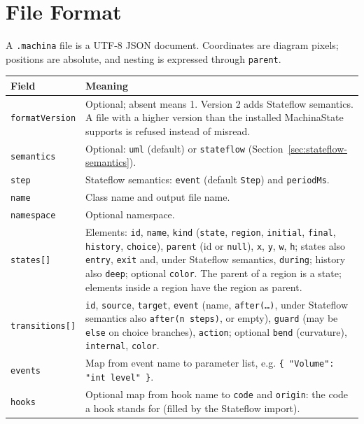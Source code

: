 \documentclass[11pt,a4paper,openany]{report}
\newcommand{\code}[1]{\texttt{#1}}
\begin{document}
\chapter{File Format}
\label{ch:format}

A \code{.machina} file is a UTF-8 JSON document. Coordinates are diagram pixels; positions are
absolute, and nesting is expressed through \code{parent}.

\begin{longtable}{@{}p{3.8cm}p{10.6cm}@{}}
\toprule
\textbf{Field} & \textbf{Meaning} \\
\midrule
\endhead
\code{formatVersion}         & Optional; absent means 1. Version 2 adds Stateflow semantics. A file with a higher version than the installed MachinaState supports is refused instead of misread. \\
\code{semantics}             & Optional: \code{uml} (default) or \code{stateflow} (Section~\ref{sec:stateflow-semantics}). \\
\code{step}                  & Stateflow semantics: \code{event} (default \code{Step}) and \code{periodMs}. \\
\code{name}                  & Class name and output file name. \\
\code{namespace}             & Optional namespace. \\
\code{states[]}              & Elements: \code{id}, \code{name}, \code{kind} (\code{state}, \code{region}, \code{initial}, \code{final}, \code{history}, \code{choice}), \code{parent} (id or \code{null}), \code{x}, \code{y}, \code{w}, \code{h}; states also \code{entry}, \code{exit} and, under Stateflow semantics, \code{during}; history also \code{deep}; optional \code{color}. The parent of a region is a state; elements inside a region have the region as parent. \\
\code{transitions[]}         & \code{id}, \code{source}, \code{target}, \code{event} (name, \code{after(\dots)}, under Stateflow semantics also \code{after(n steps)}, or empty), \code{guard} (may be \code{else} on choice branches), \code{action}; optional \code{bend} (curvature), \code{internal}, \code{color}. \\
\code{events}                & Map from event name to parameter list, e.g. \code{\{ "Volume": "int level" \}}. \\
\code{hooks}                 & Optional map from hook name to \code{code} and \code{origin}: the code a hook stands for (filled by the Stateflow import). \\

\end{longtable}
\end{document}
